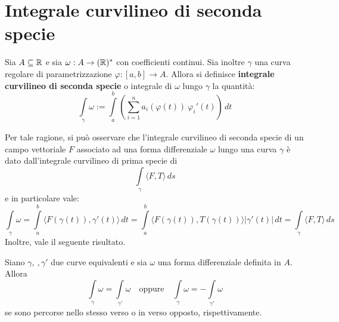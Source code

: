 \section{Integrale curvilineo di seconda specie}
\begin{definition} \label{Def: Integrale curvilineo di seconda specie}
    Sia $A \subseteq \mathbb{R}$ e sia $\omega: A \to (\mathbb{R})^*$ con coefficienti continui. Sia inoltre $\gamma$ una curva regolare di parametrizzazione $\varphi: [a, b] \to A$. Allora si definisce \textbf{integrale curvilineo di seconda specie} o integrale di $\omega$ lungo $\gamma$ la quantità:
    \begin{equation} \label{Eq: Integrale curvilineo di seconda specie}
        \int\limits_\gamma \omega := \int\limits_{a}^{b}\left( \sum\limits_{i=1}^{n}{a_i(\varphi(t))\ \varphi_i'(t)}\right)\, dt
    \end{equation}
\end{definition}
Per tale ragione, si può osservare che l'integrale curvilineo di seconda specie di un campo vettoriale $F$ associato ad una forma differenziale $\omega$ lungo una curva $\gamma$ è dato dall'integrale curvilineo di prima specie di 
\begin{equation}
    \int\limits_{\gamma}{\langle F, T \rangle}\, ds
\end{equation}
e in particolare vale:
\begin{equation}
    \int\limits_{\gamma}{\omega}= \int\limits_{a}^{b} {\langle F(\gamma(t)), \gamma'(t)\rangle}\, dt = \int\limits_{a}^{b} {\langle F(\gamma(t)), T(\gamma(t))\rangle} |\gamma'(t)|\, dt = \int\limits_{\gamma}{\langle F, T \rangle}\, ds
\end{equation}
Inoltre, vale il seguente risultato.
\begin{theorem} \label{Teo: Invarianza per equivalenza di curve dell'integrale curv di 2 specie}
    Siano $\gamma,\ , \gamma'$ due curve equivalenti e sia $\omega$ una forma differenziale definita in $A$. Allora
    \begin{equation}
        \int\limits_\gamma { \omega} = \int\limits_{\gamma'}{\omega}\quad \text{oppure} \quad \int\limits_\gamma { \omega} = -\int\limits_{\gamma'}{\omega}
    \end{equation}
    se sono percorse nello stesso verso o in verso opposto, rispettivamente.
\end{theorem}
